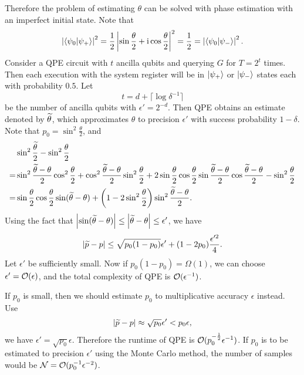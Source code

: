 Therefore the problem of estimating $\theta$ can be solved with  phase estimation with an imperfect initial state.
Note that
\begin{equation}
\left\lvert\braket{\psi_0|\psi_+}\right\rvert^2=\frac{1}{2}\left\lvert\sin\frac{\theta}{2}+\mathrm{i} \cos\frac{\theta}{2}\right\rvert^2=\frac{1}{2}=\left\lvert\braket{\psi_0|\psi_{-}}\right\rvert^2.
\end{equation}
Consider a QPE circuit with $t$ ancilla qubits and querying $G$ for $T=2^t$ times. 
Then each execution with the system register will be in $\ket{\psi_+}$ or $\ket{\psi_{-}}$ states each with probability $0.5$.
Let 
\begin{equation}
t=d+\lceil \log \delta^{-1}\rceil
\end{equation}
be the number of ancilla qubits with $\epsilon'=2^{-d}$.
Then QPE obtains an estimate denoted by $\widetilde{\theta}$, which approximates $\theta$ to precision $\epsilon'$ with success probability $1-\delta$.
Note that $p_0=\sin^2\frac{\theta}{2}$, and
\begin{equation}
\begin{split}
&\sin^2\frac{\widetilde{\theta}}{2}-\sin^2\frac{\theta}{2}\\
=&\sin^2\frac{\widetilde{\theta}-\theta}{2}\cos^2\frac{\theta}{2}+\cos^2\frac{\widetilde{\theta}-\theta}{2}\sin^2\frac{\theta}{2}
+2\sin\frac{\theta}{2}\cos\frac{\theta}{2}\sin\frac{\widetilde{\theta}-\theta}{2}\cos\frac{\widetilde{\theta}-\theta}{2}-\sin^2\frac{\theta}{2}
\\
=&\sin\frac{\theta}{2}\cos\frac{\theta}{2}\sin(\widetilde{\theta}-\theta)+
\left(1-2\sin^2\frac{\theta}{2}\right)\sin^2\frac{\widetilde{\theta}-\theta}{2}.
\end{split}
\end{equation}
Using the fact that $\left\lvert\sin (\widetilde{\theta}-\theta)\right\rvert\le \left\lvert\widetilde{\theta}-\theta\right\rvert\le \epsilon'$, we have
\begin{equation}
\left\lvert\widetilde{p}-p\right\rvert\le \sqrt{p_0(1-p_0)} \epsilon'+(1-2p_0)\frac{\epsilon'^2}{4}.
\end{equation}
Let $\epsilon'$ be sufficiently small. 
Now if $p_0(1-p_0)=\Omega(1)$, we can choose $\epsilon'=\mathcal{O}(\epsilon)$, and the total complexity  of QPE is $\mathcal{O}(\epsilon^{-1})$. 

If $p_0$ is small, then we should estimate $p_0$ to multiplicative accuracy $\epsilon$ instead. Use
\begin{equation}
\left\lvert\widetilde{p}-p\right\rvert\approx\sqrt{p_0}\epsilon'<p_0 \epsilon,
\end{equation}
we have $\epsilon'=\sqrt{p_0}\epsilon$. 
Therefore the runtime of QPE is $\mathcal{O}(p_0^{-\frac12}\epsilon^{-1})$.
If $p_0$ is to be estimated to precision $\epsilon'$ using the Monte Carlo method, the number of samples would be $\mathcal{N}=\mathcal{O}(p_0^{-1}\epsilon^{-2})$.

